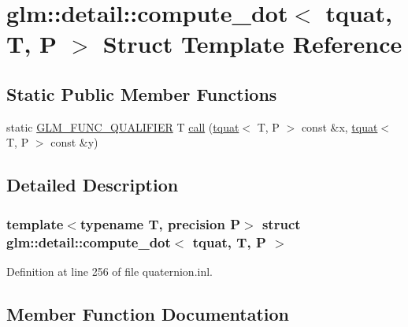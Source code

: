 \hypertarget{structglm_1_1detail_1_1compute__dot_3_01tquat_00_01_t_00_01_p_01_4}{}\section{glm\+:\+:detail\+:\+:compute\+\_\+dot$<$ tquat, T, P $>$ Struct Template Reference}
\label{structglm_1_1detail_1_1compute__dot_3_01tquat_00_01_t_00_01_p_01_4}
\subsection*{Static Public Member Functions}
\begin{DoxyCompactItemize}
\item 
static \hyperlink{setup_8hpp_a33fdea6f91c5f834105f7415e2a64407}{G\+L\+M\+\_\+\+F\+U\+N\+C\+\_\+\+Q\+U\+A\+L\+I\+F\+I\+ER} T \hyperlink{structglm_1_1detail_1_1compute__dot_3_01tquat_00_01_t_00_01_p_01_4_a4f27c293f2e5e43f23e019303336601e}{call} (\hyperlink{structglm_1_1detail_1_1tquat}{tquat}$<$ T, P $>$ const \&x, \hyperlink{structglm_1_1detail_1_1tquat}{tquat}$<$ T, P $>$ const \&y)
\end{DoxyCompactItemize}


\subsection{Detailed Description}
\subsubsection*{template$<$typename T, precision P$>$\newline
struct glm\+::detail\+::compute\+\_\+dot$<$ tquat, T, P $>$}



Definition at line 256 of file quaternion.\+inl.



\subsection{Member Function Documentation}
\mbox{\label{structglm_1_1detail_1_1compute__dot_3_01tquat_00_01_t_00_01_p_01_4_a4f27c293f2e5e43f23e019303336601e}} 
